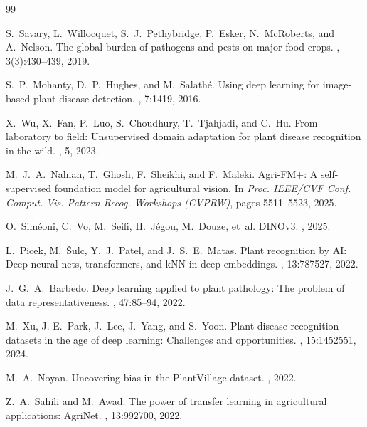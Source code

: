 \documentclass[10pt,twocolumn,letterpaper]{article}
\begin{document}
\footnotesize
\begin{thebibliography}{99}
\setlength{\itemsep}{0pt}
\setlength{\parskip}{0pt}

S.~Savary, L.~Willocquet, S.~J.~Pethybridge, P.~Esker, N.~McRoberts,
and A.~Nelson.
\newblock The global burden of pathogens and pests on major food crops.
, 3(3):430--439, 2019.

S.~P.~Mohanty, D.~P.~Hughes, and M.~Salath\'e.
\newblock Using deep learning for image-based plant disease detection.
, 7:1419, 2016.

X.~Wu, X.~Fan, P.~Luo, S.~Choudhury, T.~Tjahjadi, and C.~Hu.
\newblock From laboratory to field: Unsupervised domain adaptation for plant
  disease recognition in the wild.
, 5, 2023.

M.~J.~A.~Nahian, T.~Ghosh, F.~Sheikhi, and F.~Maleki.
\newblock Agri-FM+: A self-supervised foundation model for agricultural vision.
\newblock In {\em Proc. IEEE/CVF Conf. Comput. Vis. Pattern Recog. Workshops
  (CVPRW)}, pages 5511--5523, 2025.

O.~Sim\'eoni, C.~Vo, M.~Seifi, H.~J\'egou, M.~Douze, et~al.
\newblock DINOv3.
, 2025.

L.~Picek, M.~\v{S}ulc, Y.~J.~Patel, and J.~S.~E.~Matas.
\newblock Plant recognition by AI: Deep neural nets, transformers, and kNN in
  deep embeddings.
, 13:787527, 2022.

J.~G.~A.~Barbedo.
\newblock Deep learning applied to plant pathology: The problem of data
  representativeness.
, 47:85--94, 2022.

M.~Xu, J.-E.~Park, J.~Lee, J.~Yang, and S.~Yoon.
\newblock Plant disease recognition datasets in the age of deep learning:
  Challenges and opportunities.
, 15:1452551, 2024.

M.~A.~Noyan.
\newblock Uncovering bias in the PlantVillage dataset.
, 2022.

Z.~A.~Sahili and M.~Awad.
\newblock The power of transfer learning in agricultural applications:
  AgriNet.
, 13:992700, 2022.


\end{thebibliography}
\end{document}
